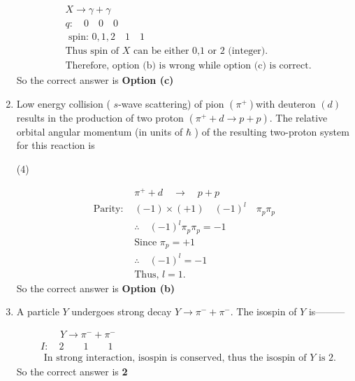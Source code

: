 \begin{enumerate}
	\begin{answer}
		\begin{align*}
		&X \rightarrow \gamma+\gamma\\
		&q: \quad 0 \quad 0 \quad 0\\
		&\text{	spin: }0,1,2 \quad 1 \quad 1\\
		&\text{Thus spin of $X$ can be either 0,1 or 2 (integer).}\\
		&\text{Therefore, option (b) is wrong while option (c) is correct.}
		\end{align*}
		So the correct answer is \textbf{Option (c)}
	\end{answer}
	\item  Low energy collision ( $s$-wave scattering) of pion $\left(\pi^{+}\right)$with deuteron $(d)$ results in the production of two proton $\left(\pi^{+}+d \rightarrow p+p\right)$. The relative orbital angular momentum (in units of $\hbar$ ) of the resulting two-proton system for this reaction is
	{}
	\begin{tasks}(4)
	\end{tasks}
	\begin{answer}
		\begin{align*}
		&\pi^{+}+d \quad \rightarrow \quad p+p\\
		\text{Parity: }&(-1) \times(+1) \quad(-1)^l \quad \pi_p \pi_p\\ &\therefore\quad (-1)^l \pi_p \pi_p=-1\\
		&\text{Since }\pi_p=+1\\
		&\therefore\quad (-1)^l=-1\\
		&\text{Thus, }l=1.
		\end{align*}
		So the correct answer is \textbf{Option (b)}
	\end{answer}
	\item  A particle $Y$ undergoes strong decay $Y \rightarrow \pi^{-}+\pi^{-}$. The isospin of $Y$ is---------
	{}
	\begin{answer}
		\begin{align*}
		&\quad \quad  Y \rightarrow \pi^{-}+\pi^{-}\\
		&I: \quad 2 \qquad 1 \qquad 1\\
		&\text { In strong interaction, isospin is conserved, thus the isospin of } Y \text { is } 2 .
		\end{align*}
		So the correct answer is \textbf{2}
	\end{answer}

\end{enumerate}
